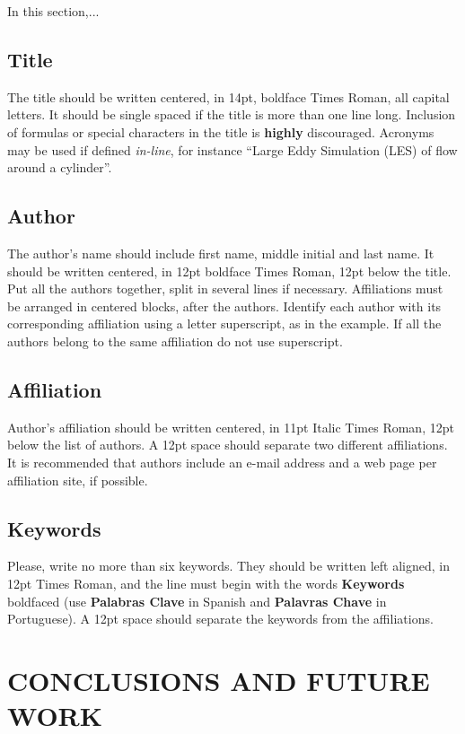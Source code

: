 \documentclass[oneside,a4paper,english,links]{amca}
\begin{document}
In this section,...



\subsection{Title}

The title should be written centered, in 14pt, boldface Times Roman,
all capital letters. It should be single spaced if the title is more
than one line long. Inclusion of formulas or special characters in the
title is \textbf{highly} discouraged. Acronyms may be used if defined
\emph{in-line}, for instance ``Large Eddy Simulation (LES) of
flow around a cylinder''.

\subsection{Author}

The author's name should include first name, middle initial and last
name. It should be written centered, in 12pt boldface Times Roman,
12pt below the title. Put all the authors together, split in several
lines if necessary. Affiliations must be arranged in centered blocks,
after the authors. Identify each author with its corresponding
affiliation using a letter superscript, as in the example. If all the
authors belong to the same affiliation do not use superscript. 

\subsection{Affiliation}

Author's affiliation should be written centered, in 11pt Italic Times Roman,
12pt below the list of authors. A 12pt space should separate two
different affiliations. It is recommended that authors include an
e-mail address and a web page per affiliation site, if possible. 

\subsection{Keywords}

Please, write no more than six keywords.  They should be written left
aligned, in 12pt Times Roman, and the line must begin with the words
{\bf Keywords} boldfaced (use {\bf Palabras Clave} in Spanish and {\bf
Palavras Chave} in Portuguese). A 12pt space should separate the
keywords from the affiliations.

\section{CONCLUSIONS AND FUTURE WORK}
\end{document}
